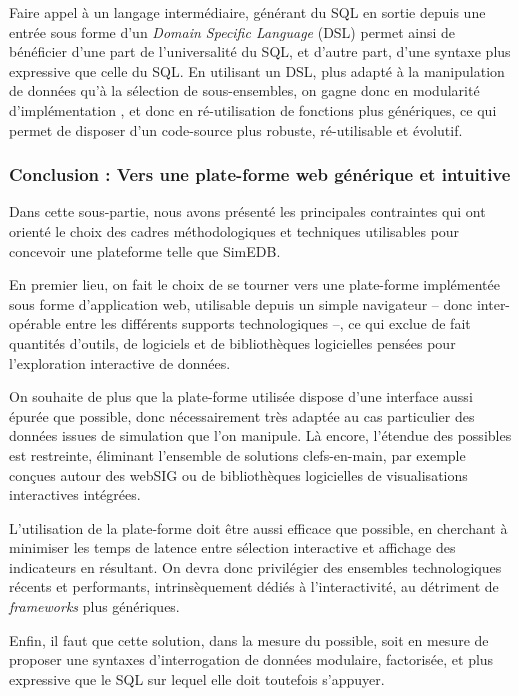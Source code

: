 Faire appel à un langage intermédiaire, générant du SQL en sortie depuis une entrée sous forme d'un \og \textit{Domain Specific Language}\fg{} (DSL) permet ainsi de bénéficier d'une part de l'universalité du SQL, et d'autre part, d'une syntaxe plus expressive que celle du SQL.
En utilisant un DSL, plus adapté à la manipulation de données qu'à la sélection de sous-ensembles, on gagne donc en modularité d'implémentation , et donc en ré-utilisation de fonctions plus génériques, ce qui permet de disposer d'un code-source plus robuste, ré-utilisable et évolutif.

\subsubsection*{Conclusion : Vers une plate-forme web générique et intuitive}

Dans cette sous-partie, nous avons présenté les principales contraintes qui ont orienté le choix des cadres méthodologiques et techniques utilisables pour concevoir une plateforme telle que SimEDB.

En premier lieu, on fait le choix de se tourner vers une plate-forme implémentée sous forme d'application web, utilisable depuis un simple navigateur -- donc inter-opérable entre les différents supports technologiques --, ce qui exclue de fait quantités d'outils, de logiciels et de bibliothèques logicielles pensées pour l'exploration interactive de données.

On souhaite de plus que la plate-forme utilisée dispose d'une interface aussi épurée que possible, donc nécessairement très adaptée au cas particulier des données issues de simulation que l'on manipule.
Là encore, l'étendue des possibles est restreinte, éliminant l'ensemble de solutions \og clefs-en-main\fg{}, par exemple conçues autour des \og webSIG\fg{} ou de bibliothèques logicielles de visualisations interactives intégrées.

L'utilisation de la plate-forme doit être aussi efficace que possible, en cherchant à minimiser les temps de latence entre sélection interactive et affichage des indicateurs en résultant.
On devra donc privilégier des ensembles technologiques récents et performants, intrinsèquement dédiés à l'interactivité, au détriment de \textit{frameworks} plus génériques.

Enfin, il faut que cette solution, dans la mesure du possible, soit en mesure de proposer une syntaxes d'interrogation de données modulaire, factorisée, et plus expressive que le SQL sur lequel elle doit toutefois s'appuyer.

